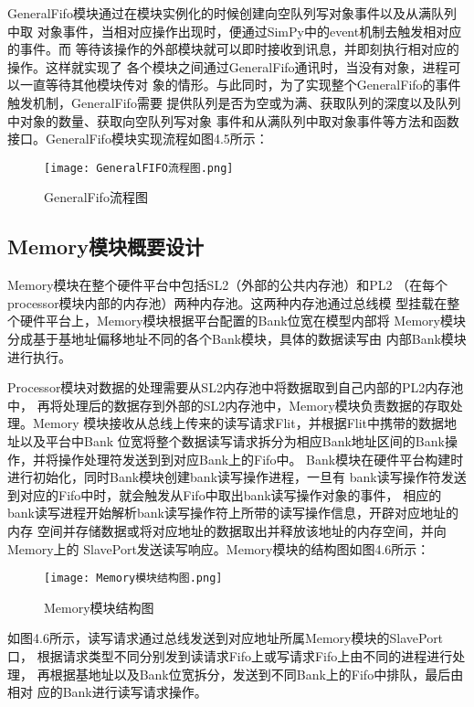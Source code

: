 GeneralFifo模块通过在模块实例化的时候创建向空队列写对象事件以及从满队列中取
对象事件，当相对应操作出现时，便通过SimPy中的event机制去触发相对应的事件。而
等待该操作的外部模块就可以即时接收到讯息，并即刻执行相对应的操作。这样就实现了
各个模块之间通过GeneralFifo通讯时，当没有对象，进程可以一直等待其他模块传对
象的情形。与此同时，为了实现整个GeneralFifo的事件触发机制，GeneralFifo需要
提供队列是否为空或为满、获取队列的深度以及队列中对象的数量、获取向空队列写对象
事件和从满队列中取对象事件等方法和函数接口。GeneralFifo模块实现流程如图4.5所示：

\begin{figure}[h]
    \centering
    \texttt{[image: GeneralFIFO流程图.png]}
    \caption{GeneralFifo流程图}
    \label{fig:badge}
\end{figure}

\subsection{Memory模块概要设计}
Memory模块\cite{32}在整个硬件平台中包括SL2（外部的公共内存池）和PL2
（在每个processor模块内部的内存池）两种内存池。这两种内存池通过总线模
型挂载在整个硬件平台上，Memory模块根据平台配置的Bank位宽在模型内部将
Memory模块分成基于基地址偏移地址不同的各个Bank模块，具体的数据读写由
内部Bank模块进行执行。

Processor模块对数据的处理需要从SL2内存池中将数据取到自己内部的PL2内存池中，
再将处理后的数据存到外部的SL2内存池中，Memory模块负责数据的存取处理。Memory
模块接收从总线上传来的读写请求Flit，并根据Flit中携带的数据地址以及平台中Bank
位宽将整个数据读写请求拆分为相应Bank地址区间的Bank操作，并将操作处理符发送到到对应Bank上的Fifo中。
Bank模块在硬件平台构建时进行初始化，同时Bank模块创建bank读写操作进程，一旦有
bank读写操作符发送到对应的Fifo中时，就会触发从Fifo中取出bank读写操作对象的事件，
相应的bank读写进程开始解析bank读写操作符上所带的读写操作信息，开辟对应地址的内存
空间并存储数据或将对应地址的数据取出并释放该地址的内存空间，并向Memory上的
SlavePort发送读写响应。Memory模块的结构图如图4.6所示：

\begin{figure}[h]
    \centering
    \texttt{[image: Memory模块结构图.png]}
    \caption{Memory模块结构图}
    \label{fig:badge}
\end{figure}

如图4.6所示，读写请求通过总线发送到对应地址所属Memory模块的SlavePort口，
根据请求类型不同分别发到读请求Fifo上或写请求Fifo上由不同的进程进行处理，
再根据基地址以及Bank位宽拆分，发送到不同Bank上的Fifo中排队，最后由相对
应的Bank进行读写请求操作。

